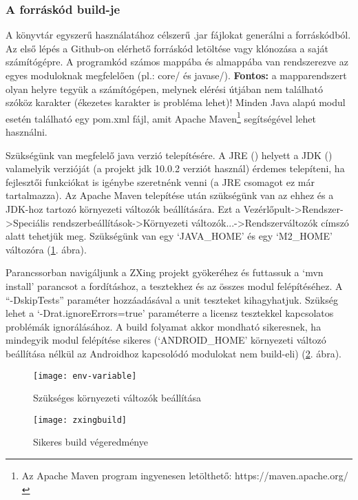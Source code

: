\documentclass[../documentation.tex]{subfiles}
\begin{document}
\subsubsection{A forráskód build-je}
A könyvtár egyszerű használatához célszerű .jar fájlokat generálni a forráskódból. Az első lépés a Github-on elérhető forráskód letöltése vagy klónozása a saját számítógépre. A programkód számos mappába és almappába van rendszerezve az egyes moduloknak megfelelően (pl.: core/ és javase/). \textbf{Fontos:} a mapparendszert olyan helyre tegyük a számítógépen, melynek elérési útjában nem található szóköz karakter (ékezetes karakter is probléma lehet)! Minden Java alapú modul esetén található egy pom.xml fájl, amit Apache Maven\footnote{Az Apache Maven program ingyenesen letölthető: https://maven.apache.org/} segítségével lehet használni.

Szükségünk van megfelelő java verzió telepítésére. A JRE () helyett a JDK () valamelyik verzióját (a projekt jdk 10.0.2 verziót használ) érdemes telepíteni, ha fejlesztői funkciókat is igénybe szeretnénk venni (a JRE csomagot ez már tartalmazza). Az Apache Maven telepítése után szükségünk van az ehhez és a JDK-hoz tartozó környezeti változók beállítására. Ezt a Vezérlőpult->Rendszer->Speciális rendszerbeállítások->Környezeti változók...->Rendszerváltozók címszó alatt tehetjük meg. Szükségünk van egy `JAVA\_HOME' és egy `M2\_HOME' változóra (\ref{fig:envvar}. ábra).

Parancssorban navigáljunk a ZXing projekt gyökeréhez és futtassuk a `mvn install' parancsot a fordításhoz, a tesztekhez és az összes modul felépítéséhez. A ``-DskipTests'' paraméter hozzáadásával a unit teszteket kihagyhatjuk. Szükség lehet a `-Drat.ignoreErrors=true' paraméterre a licensz tesztekkel kapcsolatos problémák ignorálásához. A build folyamat akkor mondható sikeresnek, ha mindegyik modul felépítése sikeres (`ANDROID\_HOME' környezeti változó beállítása nélkül az Androidhoz kapcsolódó modulokat nem build-eli) (\ref{fig:buildsuccess}. ábra).

\begin{figure}[h]
\centering
\texttt{[image: env-variable]}
\caption{Szükséges környezeti változók beállítása}
\label{fig:envvar}
\end{figure}

\begin{figure}[h]
\centering
\texttt{[image: zxingbuild]}
\caption{Sikeres build végeredménye}
\label{fig:buildsuccess}
\end{figure}
\end{document}
